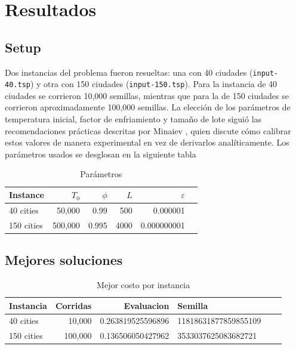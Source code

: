 \documentclass[11pt,letterpaper]{article}
\begin{document}

\section{Resultados}
\subsection{Setup}

Dos instancias del problema fueron resueltas: una con 40 ciudades (\texttt{input-40.tsp}) y otra con 150 ciudades (\texttt{input-150.tsp}). Para la instancia de 40 ciudades se corrieron 10,000 semillas, mientras que para la de 150 ciudades se corrieron aproximadamente 100,000 semillas. La elección de los parámetros de temperatura inicial, factor de enfriamiento y tamaño de lote siguió las recomendaciones prácticas descritas por Minaiev \cite{minaiev2023}, quien discute cómo calibrar estos valores de manera experimental en vez de derivarlos analíticamente. Los parámetros usados se desglosan en la siguiente tabla

\begin{table}[H]
  \centering
  \caption{Parámetros}
  \begin{tabular}{lrrrrr}
    \toprule
    Instance & $T_0$ & $\phi$ & $L$ & $\varepsilon$ \\
    \midrule
    40 cities  & 50,000 & 0.99 & 500 & 0.000001  \\
    150 cities & 500,000 & 0.995 & 4000 & 0.000000001\\
    \bottomrule
  \end{tabular}
\end{table}

\subsection{Mejores soluciones}

\begin{table}[H]
  \centering
  \caption{Mejor costo por instancia}
  \label{tab:best}
  \begin{tabular}{lrrlrr}
    \toprule
    Instancia & Corridas & Evaluacion &  Semilla \\
    \midrule
    40 cities  & 10,000 & 0.263819525596896 & 11818631877859855109 \\
    150 cities & 100,000 & 0.136506050427962 & 3533037625083682721 \\
    \bottomrule
  \end{tabular}
\end{table}
\end{document}
